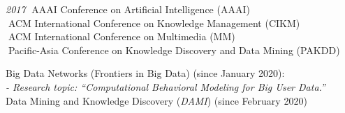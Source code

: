 \documentclass[10pt]{article}
\newenvironment{myindentpar}[1]%
{\begin{list}{}%
         {\setlength{\leftmargin}{#1}}%
         \item[]%
}
{\end{list}}
\newcounter{list}
\begin{document}
\begin{myindentpar}{0.75cm}
{\hspace{-0.75cm}\textit{2017}
\textcolor{white}{.}AAAI Conference on Artificial Intelligence (AAAI) \\
\textcolor{white}{.}ACM International Conference on Knowledge Management (CIKM) \\
\textcolor{white}{.}ACM International Conference on Multimedia (MM) \\
\textcolor{white}{.}Pacific-Asia Conference on Knowledge Discovery and Data Mining (PAKDD)

}

\hspace{-0.75cm}{\bf Editorial Board}

{\small

Big Data Networks (Frontiers in Big Data) (since January 2020): \\
\textit{- Research topic: ``Computational Behavioral Modeling for Big User Data.''} \\
Data Mining and Knowledge Discovery (\textit{DAMI}) (since February 2020)

}

\hspace{-0.75cm}{\bf Journal Reviewer}

{\small

}
\end{myindentpar}
\end{document}
